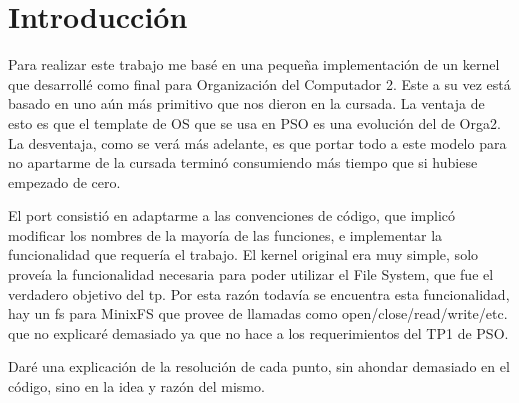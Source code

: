\section{Introducción}

Para realizar este trabajo me basé en una pequeña implementación de un kernel
que desarrollé como final para Organización del Computador 2. Este a su vez
está basado en uno aún más primitivo que nos dieron en la cursada. La ventaja
de esto es que el template de OS que se usa en PSO es una evolución del de
Orga2. La desventaja, como se verá más adelante, es que portar todo a este
modelo para no apartarme de la cursada terminó consumiendo más tiempo que si
hubiese empezado de cero.

El port consistió en adaptarme a las convenciones de código, que implicó
modificar los nombres de la mayoría de las funciones, e implementar la
funcionalidad que requería el trabajo. El kernel original era muy simple, solo
proveía la funcionalidad necesaria para poder utilizar el File System, que fue
el verdadero objetivo del tp. Por esta razón todavía se encuentra esta
funcionalidad, hay un fs para MinixFS que provee de llamadas como
open/close/read/write/etc. que no explicaré demasiado ya que no hace a los
requerimientos del TP1 de PSO.

Daré una explicación de la resolución de cada punto, sin ahondar demasiado en
el código, sino en la idea y razón del mismo.
